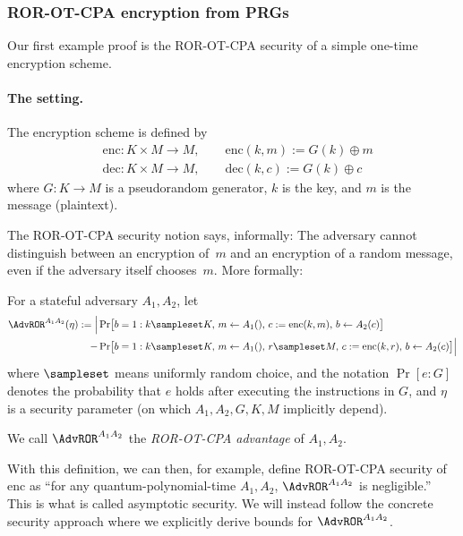 \documentclass{article}
\begin{document}
\subsubsection{ROR-OT-CPA encryption from PRGs}
\label{sec:ex.ror}

Our first example proof is the ROR-OT-CPA security of a simple
one-time encryption scheme.


\paragraph{The setting.} The encryption scheme is defined by
\begin{align*}
  &\mathrm{enc}:K\times M\to M,\qquad
  \mathrm{enc}(k,m) := G(k)\oplus m \\
  &\mathrm{dec}:K\times M\to M,\qquad
  \mathrm{dec}(k,c) := G(k)\oplus c
\end{align*}
where $G:K\to M$
is a pseudorandom generator, $k$
is the key, and $m$
is the message (plaintext). 

The ROR-OT-CPA security notion says,
informally: The adversary cannot distinguish between an encryption
of~$m$
and an encryption of a random message, even if the adversary
itself chooses~$m$. More formally:
\begin{definition}\label{def:roradv}
  For a stateful adversary $A_1,A_2$, let \symbolindexmark\AdvROR
  \begin{align*}
    \AdvROR^{A_1A_2}(\eta) :=
    \Bigl\lvert
    &\Pr\bigl[b=1:
        k\sampleset K,\, m\leftarrow A_1(),\, c:=\mathrm{enc}(k,m),\, b\leftarrow A_2(c)\bigr]
    \\    -
     &\Pr\bigl[b=1:
       k\sampleset K,\, m\leftarrow A_1(),\, r\sampleset M,\, c:=\mathrm{enc}(k,r),\, b\leftarrow A_2(c)\bigr]
       \Bigr\rvert      
  \end{align*}
  where \symbolindexmark\sampleset$\sampleset$
  means uniformly random choice, and the notation
  $\Pr[e:G]$
  denotes the probability that $e$
  holds after executing the instructions in $G$,
  and $\eta$
  is a security parameter (on which $A_1,A_2,G,K,M$
  implicitly depend).

  We call $\AdvROR^{A_1A_2}$ the \emph{ROR-OT-CPA advantage}%
  of $A_1,A_2$.
\end{definition}
With this definition, we can then, for example, define ROR-OT-CPA
security of $\mathrm{enc}$
as ``for any quantum-polynomial-time $A_1,A_2$,
$\AdvROR^{A_1A_2}$
is negligible.'' This is what is called asymptotic security. We will
instead follow the concrete security approach where we explicitly
derive bounds for $\AdvROR^{A_1A_2}$.
\end{document}

